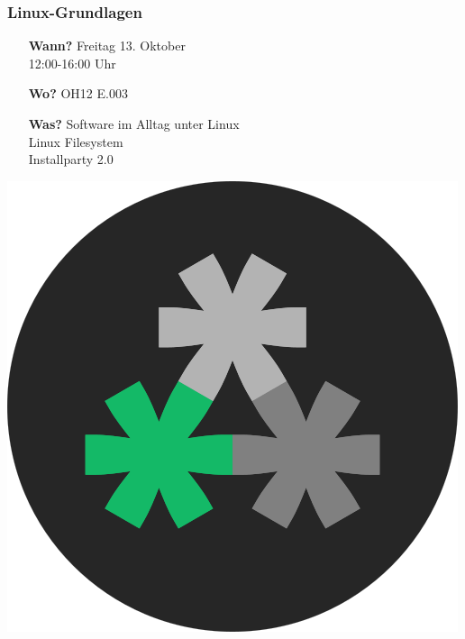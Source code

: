 \documentclass[12pt,utf8]{beamer}
\begin{document}
	\begin{frame}
		\frametitle{Linux-Grundlagen}
			\vspace*{0.5cm}
			\begin{minipage}{0.6\linewidth}
				\begin{itemize}
					\item [\textbf{Wann?}]Freitag 13. Oktober\\12:00-16:00 Uhr\newline
					\item [\textbf{Wo?}]OH12 E.003\newline
					\item [\textbf{Was?}]Software im Alltag unter Linux\\Linux Filesystem\\Installparty 2.0
				\end{itemize}
			\end{minipage}
			\begin{minipage}{0.35\linewidth}
				\hspace*{1.5cm}
				\vspace*{-5cm}
				\includegraphics[scale=0.2]{resources/logo_500px.png}
			\end{minipage}
	\end{frame}
\end{document}
